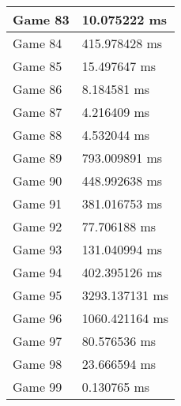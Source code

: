 \begin{tabular}{|l|l|}
	Game 83 & 10.075222 ms \\ \hline
	Game 84 & 415.978428 ms \\ \hline
	Game 85 & 15.497647 ms \\ \hline
	Game 86 & 8.184581 ms \\ \hline
	Game 87 & 4.216409 ms \\ \hline
	Game 88 & 4.532044 ms \\ \hline
	Game 89 & 793.009891 ms \\ \hline
	Game 90 & 448.992638 ms \\ \hline
	Game 91 & 381.016753 ms \\ \hline
	Game 92 & 77.706188 ms \\ \hline
	Game 93 & 131.040994 ms \\ \hline
	Game 94 & 402.395126 ms \\ \hline
	Game 95 & 3293.137131 ms \\ \hline
	Game 96 & 1060.421164 ms \\ \hline
	Game 97 & 80.576536 ms \\ \hline
	Game 98 & 23.666594 ms \\ \hline
	Game 99 & 0.130765 ms \\ \hline
\end{tabular}
